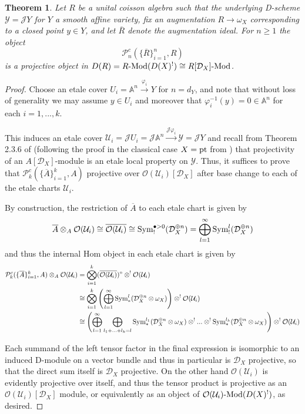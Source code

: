 \documentclass[11pt]{amsart}
\numberwithin{equation}{section}
\newtheorem{theo}{Theorem}[section]
\theoremstyle{definition}
\newcommand{\bb}{\mathbb}
\newcommand{\mc}{\mathcal}
\newcommand{\Mod}{{\textup{-Mod}}}
\newcommand{\pt}{{\textup{pt}}}
\newcommand{\0}{{\textbf{0}}}
\newcommand{\DD}{{D}}
\newcommand{\Sym}{\textup{Sym}}
\begin{document}
\begin{theo} Let $R$ be a unital coisson algebra such that the underlying D-scheme $\mc Y=\mc J Y$ for $Y$ a smooth affine variety, fix an augmentation $R\to \omega_X$ corresponding to a closed point $y \in Y$, and let $\overline{R}$ denote the augmentation ideal. For $n \geq 1$ the object
	\[ \mc P_{n}^c( \{\overline{R}\}_{i=1}^{n} , R) \]
	is a projective object in $\DD(R)=R\Mod(\DD(X)^!)\cong R[\mc D_X]\Mod$.
\end{theo}
\begin{proof} Choose an etale cover $U_i=\bb A^n \xrightarrow{\varphi_i} Y$ for $n=d_Y$, and note that without loss of generality we may assume $y\in U_i$ and moreover that $\varphi_i^{-1}(y)=0 \in \bb A^n$ for each $i=1,...,k$.
	
	This induces an etale cover $\mc U_i = \mc J U_i =\mc J \bb A^n \xrightarrow{\mc J \varphi_i }\mc Y=\mc JY$ and recall from Theorem 2.3.6 of \cite{BD1} (following the proof in the classical case $X=\pt$ from \cite{RG}) that projectivity of an $A[\mc D_X]$-module is an etale local property on $\mc Y$. Thus, it suffices to prove that $\mc P_{k}^c( \{\overline{A}\}_{i=1}^{k} , A) $ projective over $\mc O(\mc U_i)[\mc D_X]$ after base change to each of the etale charts $\mc U_i$.
	
	By construction, the restriction of $\overline{A}$ to each etale chart is given by
	\[ \overline{A}\otimes_A \mc O(\mc U_i)  \cong \overline{ \mc O(\mc U_i)} \cong \Sym_!^{\bullet >0}(\mc D_X^{\oplus n}) = \bigoplus_{l=1}^\infty   \Sym_!^l(\mc D_X^{\oplus n})  \]
	and thus the internal Hom object in each etale chart is given by
	\begin{align*}
		\mc P_{k}^c( \{\overline{A}\}_{i=1}^{k} , A)\otimes_A \mc O(\mc U_i)  & =   \bigotimes_{i=1}^{k} (\overline{ \mc O(\mc U_i)})^\circ \otimes^! \mc O(\mc U_i)  \\
		& \cong   \bigotimes_{i=1}^{k} \left( \bigoplus_{l=1}^\infty   \Sym_*^l(\mc D_X^{\oplus n}\otimes \omega_X) \right) \otimes^! \mc O(\mc U_i) \\
		& \cong \left(\bigoplus_{l=1}^\infty \bigoplus_{l_1+...+l_k=l} \Sym_*^{l_1}(\mc D_X^{\oplus n}\otimes \omega_X)\otimes^! ... \otimes^!  \Sym_*^{l_k}(\mc D_X^{\oplus n}\otimes \omega_X)\right) \otimes^! \mc O(\mc U_i)
	\end{align*}
	
	Each summand of the left tensor factor in the final expression is isomorphic to an induced D-module on a vector bundle and thus in particular is $\mc D_X$ projective, so that the direct sum itself is $\mc D_X$ projective. On the other hand $\mc O(\mc U_i)$ is evidently projective over itself, and thus the tensor product is projective as an $\mc O(\mc U_i)[\mc D_X]$ module, or equivalently as an object of $\mc O(\mc U_i)\Mod(\DD(X)^!)$, as desired.
\end{proof}
\end{document}
